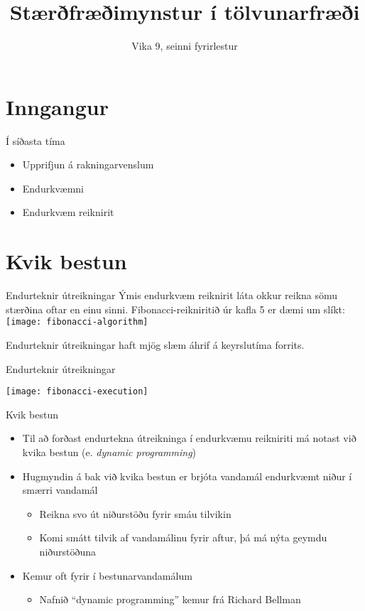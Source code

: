 \documentclass[handout]{beamer}
\title{Stærðfræðimynstur í tölvunarfræði}
\subtitle{Vika 9, seinni fyrirlestur}
\begin{document}
\begin{frame}
\titlepage
\end{frame}


\section{Inngangur}

\begin{frame}{Í síðasta tíma}
    \begin{itemize}
        \item Upprifjun á rakningarvenslum
        \item Endurkvæmni
        \item Endurkvæm reiknirit
    \end{itemize}
\end{frame}

\section{Kvik bestun}

\begin{frame}{Endurteknir útreikningar}
Ýmis endurkvæm reiknirit láta okkur reikna sömu stærðina oftar en einu sinni. Fibonacci-reikniritið úr kafla 5 er dæmi um slíkt:
\texttt{[image: fibonacci-algorithm]}

Endurteknir útreikningar haft mjög slæm áhrif á keyrslutíma forrits.
\end{frame}

\begin{frame}{Endurteknir útreikningar}
\begin{center}
\texttt{[image: fibonacci-execution]}
\end{center}
\end{frame}

\begin{frame}{Kvik bestun}
    \begin{itemize}
        \item Til að forðast endurtekna útreikninga í endurkvæmu reikniriti má notast við kvika bestun (e. \emph{dynamic programming})
        \item Hugmyndin á bak við kvika bestun er brjóta vandamál endurkvæmt niður í smærri vandamál
        \begin{itemize}
            \item Reikna svo út niðurstöðu fyrir smáu tilvikin
            \item Komi smátt tilvik af vandamálinu fyrir aftur, þá má nýta geymdu niðurstöðuna
        \end{itemize}
        \item Kemur oft fyrir í bestunarvandamálum
        \begin{itemize}
            \item Nafnið ``dynamic programming'' kemur frá Richard Bellman
        \end{itemize}
    \end{itemize}
\end{frame}
\end{document}
